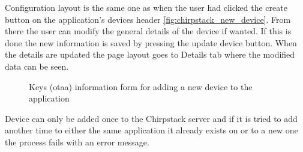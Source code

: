 Configuration layout is the same one as when the user had clicked the create button on the application's devices header \ref{fig:chirpstack_new_device}.
From there the user can modify the general details of the device if wanted.
If this is done the new information is saved by pressing the update device button.
When the details are updated the page layout goes to Details tab where the modified data can be seen.

\begin{figure}[ht]
  \centering
  \caption{Keys (\gls{otaa}) information form for adding a new device to the application}
  \label{fig:chirpstack_new_device_2}
\end{figure}

Device can only be added once to the Chirpstack server and if it is tried to add another time to either the same application it already exists on or to a new one the process fails with an error message.

\clearpage %
